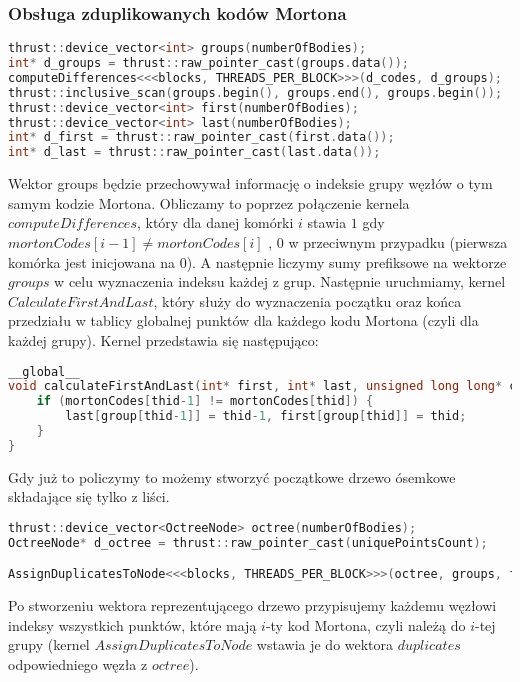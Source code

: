 \documentclass[14pt,twoside,a4paper]{article}
\theoremstyle{definition}
\begin{document}
\subsubsection{\large Obsługa zduplikowanych kodów Mortona}

\begin{lstlisting}[language=C++, frame=single, framerule=2pt, caption=Krok 3]
thrust::device_vector<int> groups(numberOfBodies);
int* d_groups = thrust::raw_pointer_cast(groups.data());
computeDifferences<<<blocks, THREADS_PER_BLOCK>>>(d_codes, d_groups);
thrust::inclusive_scan(groups.begin(), groups.end(), groups.begin());
thrust::device_vector<int> first(numberOfBodies);
thrust::device_vector<int> last(numberOfBodies);
int* d_first = thrust::raw_pointer_cast(first.data());
int* d_last = thrust::raw_pointer_cast(last.data());
\end{lstlisting}
\bigskip
Wektor groups będzie przechowywał informację o indeksie grupy węzłów o tym samym kodzie Mortona. Obliczamy to poprzez połączenie kernela $computeDifferences$, który dla danej komórki $i$ stawia $1$ gdy $mortonCodes[i-1] \ne mortonCodes[i]$ , $0$ w przeciwnym przypadku (pierwsza komórka jest inicjowana na $0$). 
A następnie liczymy sumy prefiksowe na wektorze $groups$ w celu wyznaczenia indeksu każdej z grup. Następnie uruchmiamy, kernel $CalculateFirstAndLast$, który służy do wyznaczenia początku oraz końca przedziału w tablicy globalnej punktów dla każdego kodu Mortona (czyli dla każdej grupy). Kernel przedstawia się następująco:
\begin{lstlisting}[language=C++, frame=single, framerule=2pt, caption=Kernel calculateFirstAndLast]
__global__
void calculateFirstAndLast(int* first, int* last, unsigned long long* codes, int numberOfBodies) {
    if (mortonCodes[thid-1] != mortonCodes[thid]) {
        last[group[thid-1]] = thid-1, first[group[thid]] = thid;
    }
}
\end{lstlisting}

Gdy już to policzymy to możemy stworzyć początkowe drzewo ósemkowe składające się tylko z liści.
\begin{lstlisting}[language=C++, frame=single, framerule=2pt, caption=Stworzenie wektora octree]
thrust::device_vector<OctreeNode> octree(numberOfBodies);
OctreeNode* d_octree = thrust::raw_pointer_cast(uniquePointsCount);

AssignDuplicatesToNode<<<blocks, THREADS_PER_BLOCK>>>(octree, groups, first, last);
\end{lstlisting}
Po stworzeniu wektora reprezentującego drzewo przypisujemy każdemu węzłowi indeksy wszystkich punktów, które mają $i$-ty kod Mortona, czyli należą do $i$-tej grupy (kernel $AssignDuplicatesToNode$ wstawia je do wektora $duplicates$ odpowiedniego węzła z $octree$).
\end{document}
